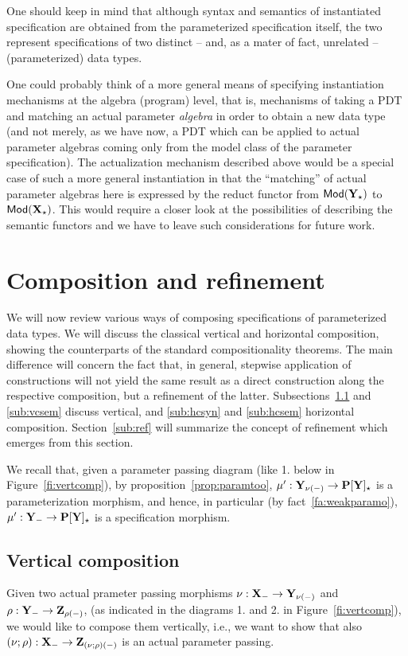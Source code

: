 One should keep in mind that although syntax and semantics of instantiated
specification are obtained from the parameterized specification itself, the
two represent specifications of two distinct -- and, as a mater of fact,
unrelated -- (parameterized) data types. 

One could probably think of a more general means of
specifying instantiation mechanisms at the algebra (program) level, that is, mechanisms of taking
a PDT and matching an actual parameter {\em algebra}
in order to
obtain a new data type (and not merely, as we have now, a PDT
 which can be applied to actual parameter algebras coming only from the model
class of the parameter specification). The actualization mechanism described
above would be a special case of such a more general instantiation in that
the ``matching'' of actual parameter algebras here is expressed by the reduct
functor from ${\sf {Mod}}({\bf Y_\star})$ to ${\sf {Mod}}({\bf X_\star})$.
This would require a closer look at
the possibilities of describing the semantic functors and we have to leave such considerations for
future work.

%
\section{Composition and refinement}\label{se:compref}
%
We will now review various ways of composing specifications of parameterized
data types. We will discuss the classical vertical and horizontal
composition, showing the counterparts of the standard compositionality
theorems. The main difference will concern the fact that, in general,
stepwise application of constructions will not yield the same result as a direct
construction along the respective composition, but a refinement of the latter.
Subsections~\ref{sub:vcsyn} and \ref{sub:vcsem} discuss vertical, and
\ref{sub:hcsyn} and \ref{sub:hcsem} horizontal
composition. Section~\ref{sub:ref} will summarize the concept of refinement
which emerges from this section.

We recall that, given a parameter passing diagram (like 1. below in
Figure~\ref{fi:vertcomp}), by proposition~\ref{prop:paramtoo},
$\mu':{\bf Y_{\nu(-)}}\to {\bf P[Y]_\star}$ is a parameterization
morphism, and hence, in particular (by fact~\ref{fa:weakparamo}), $\mu':{\bf Y}_-\to{\bf P[Y]_\star}$ is a specification morphism.


\subsection{Vertical composition}\label{sub:vcsyn}
Given two actual prameter passing morphisms $\nu:{\bf X}_-\to {\bf Y}_{\nu(-)}$ and $\rho:{\bf Y}_-\to {\bf Z}_{\rho(-)}$,
(as indicated in the diagrams 1. and 2. in Figure~\ref{fi:vertcomp}), 
we would like to compose them vertically, i.e.,
we want to show that also $(\nu;\rho):{\bf X}_- \to {\bf Z}_{(\nu;\rho)(-)}$ is
an actual parameter passing.\vspace*{-2ex}

